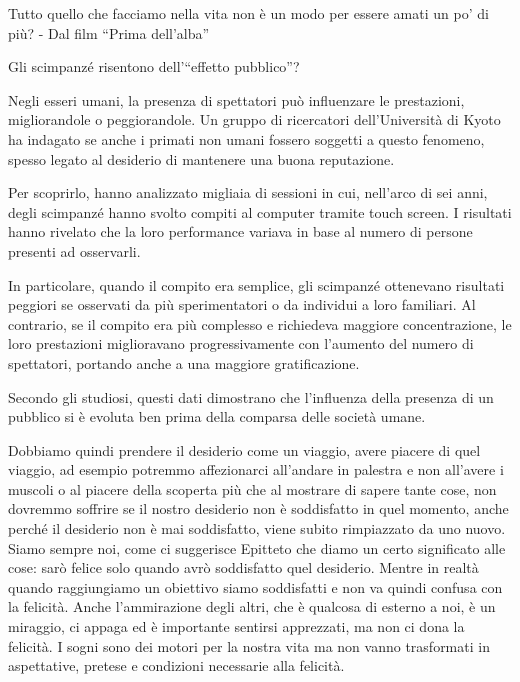 \documentclass[12pt]{book} %
\begin{document}
Tutto quello che facciamo nella vita non è un modo per essere amati un po' di più? - Dal film “Prima dell'alba”

\begin{mdframed}[linewidth=1pt]
Gli scimpanzé risentono dell’“effetto pubblico”?

Negli esseri umani, la presenza di spettatori può influenzare le prestazioni, migliorandole o peggiorandole. Un gruppo di ricercatori dell’Università di Kyoto ha indagato se anche i primati non umani fossero soggetti a questo fenomeno, spesso legato al desiderio di mantenere una buona reputazione.

Per scoprirlo, hanno analizzato migliaia di sessioni in cui, nell’arco di sei anni, degli scimpanzé hanno svolto compiti al computer tramite touch screen. I risultati hanno rivelato che la loro performance variava in base al numero di persone presenti ad osservarli.

In particolare, quando il compito era semplice, gli scimpanzé ottenevano risultati peggiori se osservati da più sperimentatori o da individui a loro familiari. Al contrario, se il compito era più complesso e richiedeva maggiore concentrazione, le loro prestazioni miglioravano progressivamente con l’aumento del numero di spettatori, portando anche a una maggiore gratificazione.

Secondo gli studiosi, questi dati dimostrano che l’influenza della presenza di un pubblico si è evoluta ben prima della comparsa delle società umane.
\end{mdframed}

Dobbiamo quindi prendere il desiderio come un viaggio, avere piacere di quel viaggio, ad esempio potremmo affezionarci
all'andare in palestra e non all'avere i muscoli o al piacere della scoperta più che al mostrare di
sapere tante cose, non dovremmo soffrire se il nostro desiderio non è soddisfatto in quel momento, anche perché il
desiderio non è mai soddisfatto, viene subito rimpiazzato da uno nuovo. Siamo sempre noi, come ci suggerisce Epitteto
che diamo un certo significato alle cose: sarò felice solo quando avrò soddisfatto quel desiderio. Mentre in realtà
quando raggiungiamo un obiettivo siamo soddisfatti e non va quindi confusa con la felicità. Anche
l'ammirazione degli altri, che è qualcosa di esterno a noi, è un miraggio, ci appaga ed è
importante sentirsi apprezzati, ma non ci dona la felicità. I sogni sono dei motori per la nostra vita ma non vanno
trasformati in aspettative, pretese e condizioni necessarie alla felicità.
\end{document}
